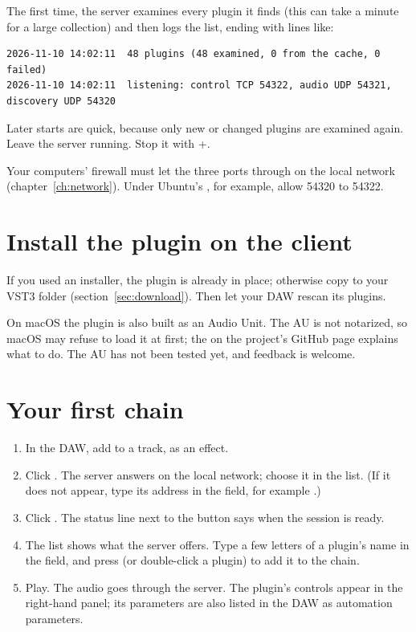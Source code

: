 The first time, the server examines every plugin it finds (this can take a
minute for a large collection) and then logs the list, ending with lines like:

\begin{lstlisting}[language={}]
2026-11-10 14:02:11  48 plugins (48 examined, 0 from the cache, 0 failed)
2026-11-10 14:02:11  listening: control TCP 54322, audio UDP 54321, discovery UDP 54320
\end{lstlisting}

Later starts are quick, because only new or changed plugins are examined
again. Leave the server running. Stop it with +.

\begin{note}
Your computers' firewall must let the three ports through on the local
network (chapter~\ref{ch:network}). Under Ubuntu's , for example,
allow 54320 to 54322.
\end{note}

\section{Install the plugin on the client}

If you used an installer, the plugin is already in place; otherwise copy
 to your VST3 folder (section~\ref{sec:download}). Then let
your DAW rescan its plugins.

On macOS the plugin is also built as an Audio Unit. The AU is not notarized,
so macOS may refuse to load it at first; the  on the project's
GitHub page explains what to do. The AU has not been tested yet, and feedback
is welcome.

\section{Your first chain}

\begin{enumerate}
  \item In the DAW, add  to a track, as an effect.
  \item Click . The server answers on the local network; choose it
    in the list. (If it does not appear, type its address in the field, for
    example .)
  \item Click . The status line next to the button says when
    the session is ready.
  \item The list  shows what the server offers. Type a few
    letters of a plugin's name in the  field, and press
     (or double-click a plugin) to add it to the chain.
  \item Play. The audio goes through the server. The plugin's controls
    appear in the right-hand panel; its parameters are also listed in the
    DAW as automation parameters.
\end{enumerate}

